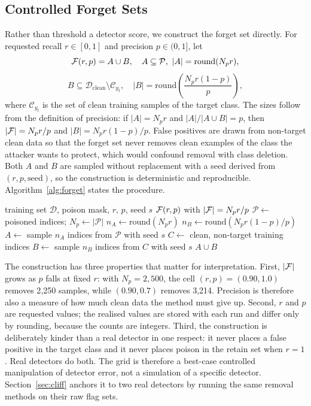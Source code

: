 \subsection{Controlled Forget Sets}
Rather than threshold a detector score, we construct the forget set directly.
For requested recall $r\in[0,1]$ and precision $p\in(0,1]$, let
\begin{equation}
\mathcal{F}(r,p)=A\cup B,\quad
A\subseteq\mathcal{P},\ |A|=\mathrm{round}(N_p r),
\label{eq:forgetA}
\end{equation}
\begin{equation}
B\subseteq\mathcal{D}_{\mathrm{clean}}\setminus
\mathcal{C}_{y_t},\quad
|B|=\mathrm{round}\!\left(\frac{N_p r(1-p)}{p}\right),
\label{eq:forgetB}
\end{equation}
where $\mathcal{C}_{y_t}$ is the set of clean training samples of the target
class. The sizes follow from the definition of precision: if $|A|=N_p r$ and
$|A|/|A\cup B|=p$, then $|\mathcal{F}|=N_pr/p$ and $|B|=N_pr(1-p)/p$. False positives
are drawn from non-target clean data so that the forget set never removes clean
examples of the class the attacker wants to protect, which would confound
removal with class deletion. Both $A$ and $B$ are sampled without replacement
with a seed derived from $(r,p,\text{seed})$, so the construction is
deterministic and reproducible. Algorithm~\ref{alg:forget} states the procedure.

\begin{algorithm}[t]
\caption{Controlled forget-set construction}
\label{alg:forget}
\begin{algorithmic}[1]
\Require training set $\mathcal{D}$, poison mask, $r$, $p$, seed $s$
\Ensure $\mathcal{F}(r,p)$ with $|\mathcal{F}|=N_pr/p$
\State $\mathcal{P}\gets$ poisoned indices; $N_p\gets|\mathcal{P}|$
\State $n_A\gets\mathrm{round}(N_pr)$
\State $n_B\gets\mathrm{round}(N_pr(1-p)/p)$
\State $A\gets$ sample $n_A$ indices from $\mathcal{P}$ with seed $s$
\State $C\gets$ clean, non-target training indices
\State $B\gets$ sample $n_B$ indices from $C$ with seed $s$
\State \Return $A\cup B$
\end{algorithmic}
\end{algorithm}

The construction has three properties that matter for interpretation. First,
$|\mathcal{F}|$ grows as $p$ falls at fixed $r$: with $N_p=2{,}500$, the cell
$(r,p)=(0.90,1.0)$ removes 2{,}250 samples, while $(0.90,0.7)$ removes 3{,}214.
Precision is therefore also a measure of how much clean data the method must
give up. Second, $r$ and $p$ are requested values; the realised values are stored
with each run and differ only by rounding, because the counts are integers.
Third, the construction is deliberately kinder than a real detector in one
respect: it never places a false positive in the target class and it never
places poison in the retain set when $r=1$. Real detectors do both. The grid is
therefore a best-case controlled manipulation of detector error, not a
simulation of a specific detector. Section~\ref{sec:cliff} anchors it to two real
detectors by running the same removal methods on their raw flag sets.

